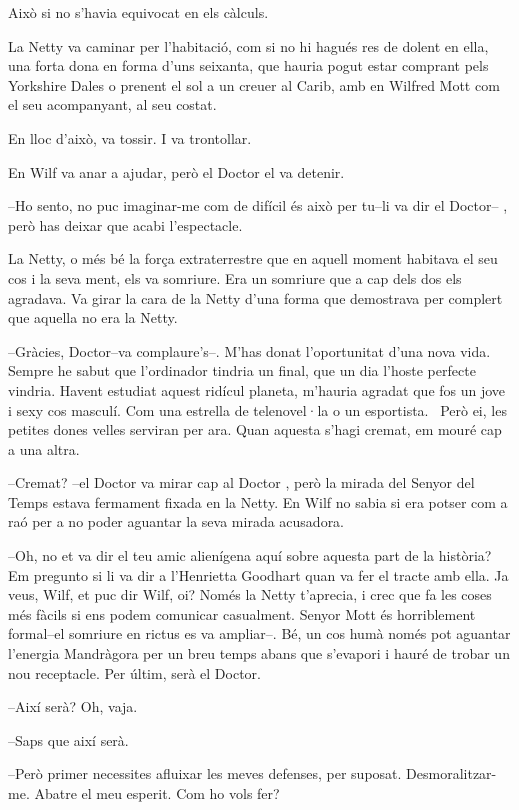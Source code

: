 Això si no s'havia equivocat en els càlculs.

La Netty va caminar per l'habitació, com si no hi hagués res de dolent
en ella, una forta dona en forma d'uns seixanta, que hauria pogut estar
comprant pels Yorkshire Dales o prenent el sol a un creuer al Carib, amb
en Wilfred Mott com el seu acompanyant, al seu costat.

En lloc d'això, va tossir. I va trontollar.

En Wilf va anar a ajudar, però el Doctor el va detenir.

--Ho sento, no puc imaginar-me com de difícil és això per tu--li va dir
el Doctor-- , però has deixar que acabi l'espectacle.

La Netty, o més bé la força extraterrestre que en aquell moment habitava
el seu cos i la seva ment, els va somriure. Era un somriure que a cap
dels dos els agradava. Va girar la cara de la Netty d'una forma que
demostrava per complert que aquella no era la Netty.

--Gràcies, Doctor--va complaure's--. M'has donat l'oportunitat d'una
nova vida. Sempre he sabut que l'ordinador tindria un final, que un dia
l'hoste perfecte vindria. Havent estudiat aquest ridícul planeta,
m'hauria agradat que fos un jove i sexy cos masculí. Com una estrella de
telenovel·la o un esportista. ~Però ei, les petites dones velles
serviran per ara. Quan aquesta s'hagi cremat, em mouré cap a una altra.

--Cremat? --el Doctor va mirar cap al Doctor , però la mirada del Senyor
del Temps estava fermament fixada en la Netty. En Wilf no sabia si era
potser com a raó per a no poder aguantar la seva mirada acusadora.

--Oh, no et va dir el teu amic alienígena aquí sobre aquesta part de la
història? Em pregunto si li va dir a l'Henrietta Goodhart quan va fer el
tracte amb ella. Ja veus, Wilf, et puc dir Wilf, oi? Només la Netty
t'aprecia, i crec que fa les coses més fàcils si ens podem comunicar
casualment. Senyor Mott és horriblement formal--el somriure en rictus es
va ampliar--. Bé, un cos humà només pot aguantar l'energia Mandràgora
per un breu temps abans que s'evapori i hauré de trobar un nou
receptacle. Per últim, serà el Doctor.

--Així serà? Oh, vaja.

--Saps que així serà.

--Però primer necessites afluixar les meves defenses, per suposat.
Desmoralitzar-me. Abatre el meu esperit. Com ho vols fer?

